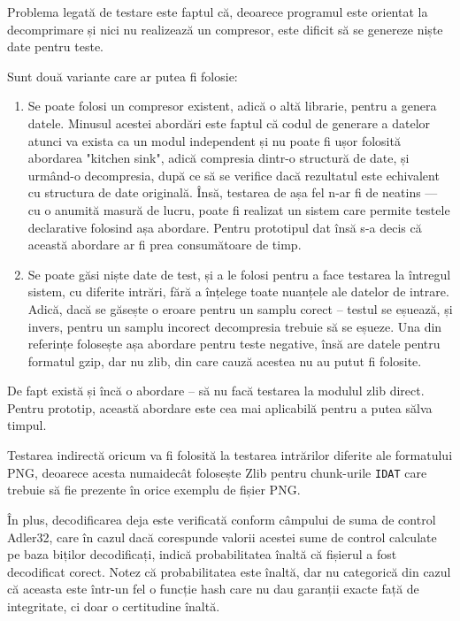 \documentclass[a4paper,12pt]{report}
\begin{document}
Problema legată de testare este faptul că, deoarece programul este orientat
la decomprimare și nici nu realizează un compresor,
este dificit să se genereze niște date pentru teste.

Sunt două variante care ar putea fi folosie:
\begin{enumerate}
    \item
        Se poate folosi un compresor existent, adică o altă librarie, pentru a genera datele.
        Minusul acestei abordări este faptul că codul de generare a datelor atunci va exista
        ca un modul independent și nu poate fi ușor folosită abordarea "kitchen sink", adică
        compresia dintr-o structură de date, și urmând-o decompresia, după ce să se verifice
        dacă rezultatul este echivalent cu structura de date originală.
        Însă, testarea de așa fel n-ar fi de neatins --- cu o anumită masură de lucru,
        poate fi realizat un sistem care permite testele declarative folosind așa abordare.
        Pentru prototipul dat însă s-a decis că această abordare ar fi prea consumătoare de timp.
    \item
        Se poate găsi niște date de test, și a le folosi pentru a face testarea
        la întregul sistem, cu diferite intrări, fără a înțelege toate nuanțele ale datelor de intrare.
        Adică, dacă se găsește o eroare pentru un samplu corect -- testul se eșuează,
        și invers, pentru un samplu incorect decompresia trebuie să se eșueze.
        Una din referințe \cite{gzip_impl} folosește așa abordare pentru teste negative,
        însă are datele pentru formatul gzip, dar nu zlib, din care cauză acestea nu au putut fi folosite.
\end{enumerate}

De fapt există și încă o abordare -- să nu facă testarea la modulul zlib direct.
Pentru prototip, această abordare este cea mai aplicabilă pentru a putea sălva timpul.

Testarea indirectă oricum va fi folosită la testarea intrărilor diferite ale formatului \ac{PNG},
deoarece acesta numaidecât folosește Zlib pentru chunk-urile \texttt{IDAT} care trebuie să fie prezente
în orice exemplu de fișier \ac{PNG}.

În plus, decodificarea deja este verificată conform câmpului de suma de control Adler32,
care în cazul dacă corespunde valorii acestei sume de control calculate pe baza biților decodificați,
indică probabilitatea înaltă că fișierul a fost decodificat corect. 
Notez că probabilitatea este înaltă, dar nu categorică din cazul că aceasta este într-un fel o funcție hash
care nu dau garanții exacte față de integritate, ci doar o certitudine înaltă.
\end{document}
